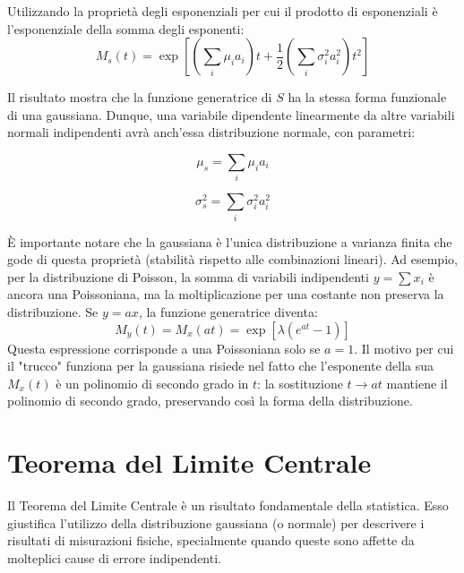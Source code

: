 \documentclass[openany,a4paper,12pt]{book}
\theoremstyle{remark}
\begin{document}
Utilizzando la proprietà degli esponenziali per cui il prodotto di esponenziali è l'esponenziale della somma degli esponenti:
\begin{equation}
M_s(t) = \exp \left[ \left(\sum_{i} \mu_i a_i\right) t + \frac{1}{2} \left( \sum_{i} \sigma_i^2 a_i^2 \right) t^2 \right]
\end{equation}

Il risultato mostra che la funzione generatrice di $S$ ha la stessa forma funzionale di una gaussiana. Dunque, una variabile dipendente linearmente da altre variabili normali indipendenti avrà anch'essa distribuzione normale, con parametri:

\begin{equation}
\mu_s = \sum_{i} \mu_i a_i
\end{equation}

\begin{equation}
\sigma_s^2 = \sum_{i} \sigma_i^2 a_i^2
\end{equation}

È importante notare che la gaussiana è l'unica distribuzione a varianza finita che gode di questa proprietà (stabilità rispetto alle combinazioni lineari).
Ad esempio, per la distribuzione di Poisson, la somma di variabili indipendenti $y = \sum x_i$ è ancora una Poissoniana, ma la moltiplicazione per una costante non preserva la distribuzione. Se $y=ax$, la funzione generatrice diventa:
\begin{equation}
M_y(t) = M_x(at) = \exp [\lambda (e^{at} - 1)]
\end{equation}
Questa espressione corrisponde a una Poissoniana solo se $a=1$.
Il motivo per cui il "trucco" funziona per la gaussiana risiede nel fatto che l'esponente della sua $M_x(t)$ è un polinomio di secondo grado in $t$: la sostituzione $t \to at$ mantiene il polinomio di secondo grado, preservando così la forma della distribuzione.


\section{Teorema del Limite Centrale}

Il Teorema del Limite Centrale è un risultato fondamentale della statistica. Esso giustifica l'utilizzo della distribuzione gaussiana (o normale) per descrivere i risultati di misurazioni fisiche, specialmente quando queste sono affette da molteplici cause di errore indipendenti.
\end{document}
